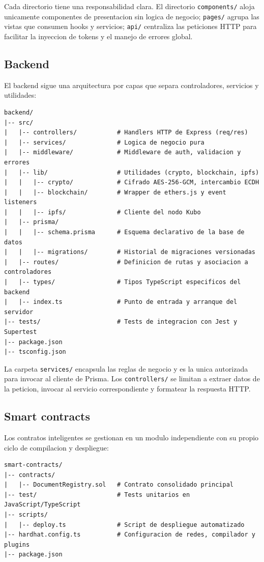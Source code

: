 \documentclass[11pt, a4paper]{article}
\begin{document}
Cada directorio tiene una responsabilidad clara. El directorio \texttt{components/} aloja unicamente componentes de presentacion sin logica de negocio; \texttt{pages/} agrupa las vistas que consumen hooks y servicios; \texttt{api/} centraliza las peticiones HTTP para facilitar la inyeccion de tokens y el manejo de errores global.

\subsection{Backend}

El backend sigue una arquitectura por capas que separa controladores, servicios y utilidades:

\begin{lstlisting}
backend/
|-- src/
|   |-- controllers/           # Handlers HTTP de Express (req/res)
|   |-- services/              # Logica de negocio pura
|   |-- middleware/            # Middleware de auth, validacion y errores
|   |-- lib/                   # Utilidades (crypto, blockchain, ipfs)
|   |   |-- crypto/            # Cifrado AES-256-GCM, intercambio ECDH
|   |   |-- blockchain/        # Wrapper de ethers.js y event listeners
|   |   |-- ipfs/              # Cliente del nodo Kubo
|   |-- prisma/
|   |   |-- schema.prisma      # Esquema declarativo de la base de datos
|   |   |-- migrations/        # Historial de migraciones versionadas
|   |-- routes/                # Definicion de rutas y asociacion a controladores
|   |-- types/                 # Tipos TypeScript especificos del backend
|   |-- index.ts               # Punto de entrada y arranque del servidor
|-- tests/                     # Tests de integracion con Jest y Supertest
|-- package.json
|-- tsconfig.json
\end{lstlisting}

La carpeta \texttt{services/} encapsula las reglas de negocio y es la unica autorizada para invocar al cliente de Prisma. Los \texttt{controllers/} se limitan a extraer datos de la peticion, invocar al servicio correspondiente y formatear la respuesta HTTP.

\subsection{Smart contracts}

Los contratos inteligentes se gestionan en un modulo independiente con su propio ciclo de compilacion y despliegue:

\begin{lstlisting}
smart-contracts/
|-- contracts/
|   |-- DocumentRegistry.sol   # Contrato consolidado principal
|-- test/                      # Tests unitarios en JavaScript/TypeScript
|-- scripts/
|   |-- deploy.ts              # Script de despliegue automatizado
|-- hardhat.config.ts          # Configuracion de redes, compilador y plugins
|-- package.json
\end{lstlisting}
\end{document}
